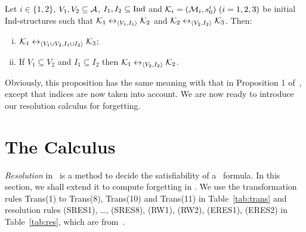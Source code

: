 \documentclass[letterpaper]{article} %
\begin{document}
\begin{proposition}\label{pro:VI:div}
Let $i\in \{1,2\}$, $V_1,V_2\subseteq\cal A$, $I_1, I_2 \subseteq \textrm{Ind}$
and ${\cal K}_i=({\cal M}_i,s_0^i)~(i=1,2,3)$ be initial Ind-structures
 such that
${\cal K}_1\leftrightarrow_{{\langle{V_1, I_1}\rangle}}{\cal K}_2$ and ${\cal K}_2\leftrightarrow_{{\langle{V_2,I_2}\rangle}}{\cal K}_3$.
 Then:
 \begin{enumerate}[(i)]
   \item ${\cal K}_1\leftrightarrow_{{\langle{V_1\cup V_2, I_1 \cup I_2}\rangle}}{\cal K}_3$;
   \item If $V_1 \subseteq V_2$ and $I_1 \subseteq I_2$ then ${\cal K}_1 \leftrightarrow_{{\langle{V_2, I_2}\rangle}} {\cal K}_2$.
 \end{enumerate}
\end{proposition}

Obviously, this proposition has the same meaning with that in Proposition 1 of~\cite{renyansfirstpaper}, except that indices are now taken into account.
We are now ready to introduce our resolution calculus for forgetting. 


\section{The Calculus}\label{resolution}
\emph{Resolution} in \CTL\ is a method to decide the satisfiability of a \CTL\ formula.
In this section, we shall extend it to compute forgetting in \CTL.
We use the transformation rules Trans(1) to Trans(8), Trans(10) and Trans(11) in Table~\ref{tab:trans} and resolution rules (SRES1), \dots, (SRES8), (RW1), (RW2), (ERES1), (ERES2) in Table~\ref{tab:res}, which are from~\cite{zhang2014resolution}. 
\end{document}
